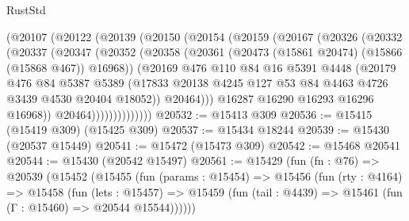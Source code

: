 \begin{lexlean}{RustStd}
\begin{coremodule}
              (@20107
                (@20122
                  (@20139
                    (@20150
                      (@20154
                        (@20159
                          (@20167
                            (@20326
                              (@20332
                                (@20337
                                  (@20347
                                    (@20352
                                      (@20358
                                        (@20361
                                          (@20473 (@15861 @20474) (@15866 (@15868 @467)) @16968))
                                        (@20169
                                          @476
                                          @110
                                          @84
                                          @16
                                          @5391
                                          @4448
                                          (@20179
                                            @476
                                            @84
                                            @5387
                                            @5389
                                            (@17833
                                              @20138
                                              @4245
                                              @127
                                              @53
                                              @84
                                              @4463
                                              @4726
                                              @3439
                                              @4530
                                              @20404
                                              @18052))
                                          @20464)))
                                    @16287
                                    @16290
                                    @16293
                                    @16296
                                    @16968))
                                @20464))))))))))))))
@20532 := @15413 @309
@20536 := @15415 (@15419 @309) (@15425 @309)
@20537 := @15434 @18244
@20539 := @15430 (@20537 @15449)
@20541 := @15472 (@15473 @309)
@20542 := @15468 @20541
@20544 := @15430 (@20542 @15497)
@20561 := @15429
    (fun (fn : @76) =>
    @20539
      (@15452
        (@15455
          (fun (params : @15454) =>
          @15456
            (fun (rty : @4164) =>
            @15458
              (fun (lets : @15457) =>
              @15459 (fun (tail : @4439) => @15461 (fun (Γ : @15460) => @20544 @15544))))))

\end{coremodule}
\end{lexlean}
